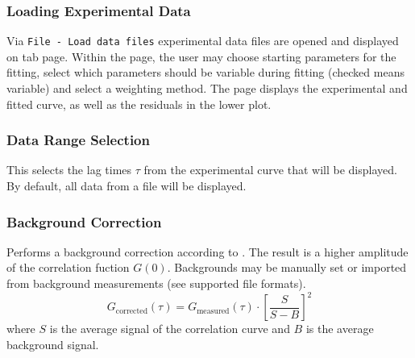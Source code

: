 \subsubsection{Loading Experimental Data}
Via \texttt{File - Load data files} experimental data files are opened and displayed on tab page. Within the page, the user may choose starting parameters for the fitting, select which parameters should be variable during fitting (checked means variable) and select a weighting method. The page displays the experimental and fitted curve, as well as the residuals in the lower plot.


\subsubsection{Data Range Selection}
This selects the lag times $\tau$ from the experimental curve that will be displayed. By default, all data from a file will be displayed. 


\subsubsection{Background Correction}
 Performs a background correction according to \cite{Thomps:bookFCS2002}. The result is a higher amplitude of the correlation fuction $G(0)$. Backgrounds may be manually set or imported from background measurements (see supported file formats).
\begin{equation}
G_\mathrm{corrected}(\tau) = G_\mathrm{measured}(\tau) \cdot \left[ \frac{S}{S-B} \right]^2
\label{eq:BG_correction}
\end{equation}
where $S$ is the average signal of the correlation curve and $B$ is the average background signal.


